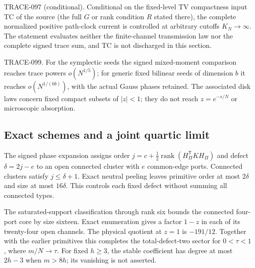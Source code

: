 TRACE-097 (conditional). Conditional on the fixed-level TV compactness
input TC of the source (the full $G$ or rank condition $R$ stated there),
the complete normalized positive path-clock current is controlled at
arbitrary cutoffs $K_N\to\infty$. The statement evaluates neither the
finite-channel transmission law nor the complete signed trace sum, and
TC is not discharged in this section.

TRACE-099. For the symplectic seeds the signed mixed-moment comparison
reaches trace powers $o(N^{1/5})$; for generic fixed bilinear seeds of
dimension $b$ it reaches $o(N^{1/(6b)})$, with the actual Gauss phases
retained. The associated disk laws concern fixed compact subsets of
$|z|<1$; they do not reach $z=e^{-s/N}$ or microscopic absorption.

\subsection{Exact schemes and a joint quartic limit}

The signed phase expansion assigns order
$j=c+\tfrac12\operatorname{rank}(H_\Pi^{\mathsf T}KH_\Pi)$ and defect
$\delta=2j-e$ to an open connected cluster with $e$ common-edge ports.
Connected clusters satisfy $j\le\delta+1$.  Exact neutral peeling leaves
primitive order at most $2\delta$ and size at most $16\delta$.  This
controls each fixed defect without summing all connected types.

The saturated-support classification through rank six bounds the connected
four-port core by size sixteen.  Exact enumeration gives a factor $1-z$
in each of its twenty-four open channels.  The physical quotient at
$z=1$ is $-191/12$.  Together with the earlier primitives this completes
the total-defect-two sector for $0<\tau<1$, where $m/N\to\tau$.
For fixed $h\ge3$, the stable coefficient has degree at most $2h-3$
when $m>8h$; its vanishing is not asserted.


